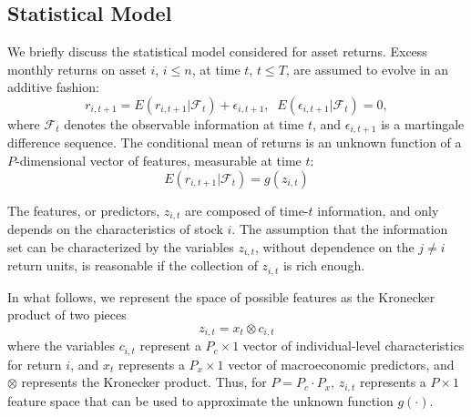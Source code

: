 \documentclass{article}
\begin{document}
\subsection{Statistical Model}
We briefly discuss the statistical model considered for asset returns. Excess monthly returns on asset $i$, $i\le n$, at time $t$, $t\le T$, are assumed to evolve in an additive fashion:
\begin{equation}\label{eq:model}
r_{i, t+1} = E(r_{i, t+1} | \mathcal{F}_t) + \epsilon_{i, t+1},\;\;E(\epsilon_{i, t+1}|\mathcal{F}_{t})=0,
\end{equation} where $\mathcal{F}_t$ denotes the observable information at time $t$, and $\epsilon_{i,t+1}$ is a martingale difference sequence. The conditional mean of returns is an unknown function of a $P$-dimensional vector of features, measurable at time $t$: 
\begin{equation}
E(r_{i, t+1} | \mathcal{F}_t) = g(z_{i,t})
\end{equation} 

The features, or predictors, $z_{i,t}$ are composed of time-$t$ information, and only depends on the characteristics of stock $i$. The assumption that the information set can be characterized by the variables $z_{i,t}$, without dependence on the $j\neq i$ return units, is reasonable if the collection of $z_{i,t}$ is rich enough. 

In what follows, we represent  the space of possible features as the Kronecker product of two pieces
\begin{equation}
\label{kronecker_equation}
z_{i,t} = x_t \otimes c_{i,t}
\end{equation}where the variables \( c_{i,t} \) represent a \( P_c \times 1 \) vector of individual-level characteristics for return \(i\), and \(x_t\) represents a $P_x \times 1$ vector of macroeconomic predictors, and $\otimes$ represents the Kronecker product. Thus, for $P = P_c\cdot P_x$, $z_{i,t}$ represents a $P \times 1$ feature space that can be used to approximate the unknown function $g(\cdot)$.
\end{document}

